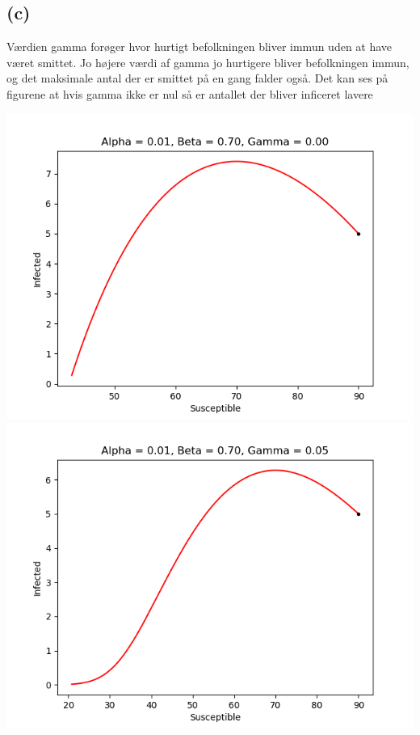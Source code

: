 \subsection*{(c)}
%
Værdien gamma forøger hvor hurtigt befolkningen bliver immun uden at have været smittet. Jo højere værdi af gamma jo hurtigere bliver befolkningen immun, og det maksimale antal der er smittet på en gang falder også. Det kan ses på figurene at hvis gamma ikke er nul så er antallet der bliver inficeret lavere


\includegraphics[scale=0.4]{fig/img/a1_b7_g0.png}
\includegraphics[scale=0.4]{fig/img/a1_b7_g5.png}\\
